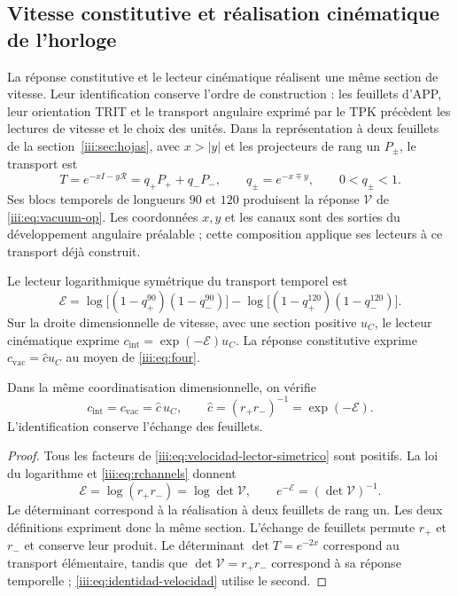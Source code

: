 \subsection{Vitesse constitutive et réalisation cinématique de l’horloge}
\label{iii:sec:enlace-velocidad-constitutiva}

La réponse constitutive et le lecteur cinématique réalisent une même
section de vitesse. Leur identification conserve l’ordre de construction :
les feuillets d’APP, leur orientation TRIT et le transport angulaire exprimé
par le TPK précèdent les lectures de vitesse et le choix des unités.
Dans la représentation à deux feuillets de la
section~\ref{iii:sec:hojas}, avec $x>|y|$ et les projecteurs de rang un
$P_\pm$, le transport est
\[
 T=e^{-xI-y\mathcal R}=q_+P_++q_-P_-,
 \qquad q_\pm=e^{-x\mp y},\qquad 0<q_\pm<1.
\]
Ses blocs temporels de longueurs $90$ et $120$ produisent la réponse
$\mathcal V$ de \eqref{iii:eq:vacuum-op}. Les coordonnées $x,y$ et les
canaux sont des sorties du développement angulaire préalable ; cette composition
applique ses lecteurs à ce transport déjà construit.

Le lecteur logarithmique symétrique du transport temporel est
\begin{equation}
 \mathcal E=
 \log\!\bigl[(1-q_+^{90})(1-q_-^{90})\bigr]
 -\log\!\bigl[(1-q_+^{120})(1-q_-^{120})\bigr].
 \label{iii:eq:velocidad-lector-simetrico}
\end{equation}
Sur la droite dimensionnelle de vitesse, avec une section positive $u_C$, le
lecteur cinématique exprime $c_{\mathrm{int}}=\exp(-\mathcal E)u_C$.
La réponse constitutive exprime
$c_{\mathrm{vac}}=\widehat c u_C$ au moyen de \eqref{iii:eq:four}.

\begin{proposition}
\label{iii:prop:identidad-velocidad}
Dans la même coordinatisation dimensionnelle, on vérifie
\begin{equation}
 c_{\mathrm{int}}=c_{\mathrm{vac}}=\widehat c\,u_C,
 \qquad \widehat c=(r_+r_-)^{-1}=\exp(-\mathcal E).
 \label{iii:eq:identidad-velocidad}
\end{equation}
L'identification conserve l'échange des feuillets.
\end{proposition}
\begin{proof}
Tous les facteurs de \eqref{iii:eq:velocidad-lector-simetrico} sont
positifs. La loi du logarithme et \eqref{iii:eq:rchannels} donnent
\[
 \mathcal E=\log(r_+r_-)=\log\det\mathcal V,
 \qquad e^{-\mathcal E}=(\det\mathcal V)^{-1}.
\]
Le déterminant correspond à la réalisation à deux feuillets de rang un.
Les deux définitions expriment donc la même section. L’échange
de feuillets permute $r_+$ et $r_-$ et conserve leur produit. Le déterminant
$\det T=e^{-2x}$ correspond au transport élémentaire, tandis que
$\det\mathcal V=r_+r_-$ correspond à sa réponse temporelle ;
\eqref{iii:eq:identidad-velocidad} utilise le second.
\end{proof}

